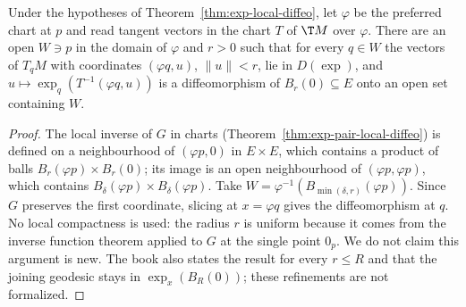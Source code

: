\begin{theorem}
  \label{thm:uniformly-normal}
  \leanok
  Under the hypotheses of Theorem~\ref{thm:exp-local-diffeo}, let $\varphi$ be the preferred chart
  at $p$ and read tangent vectors in the chart $T$ of $\T M$ over $\varphi$. There are an open
  $W \ni p$ in the domain of $\varphi$ and $r > 0$ such that for every $q \in W$ the vectors of
  $T_qM$ with coordinates $(\varphi q, u)$, $\|u\| < r$, lie in $D(\exp)$, and
  $u \mapsto \exp_q(T^{-1}(\varphi q, u))$ is a diffeomorphism of $B_r(0) \subseteq E$ onto an open
  set containing $W$.
\end{theorem}

\begin{proof}
  \leanok
  The local inverse of $G$ in charts (Theorem~\ref{thm:exp-pair-local-diffeo}) is defined on a
  neighbourhood of $(\varphi p, 0)$ in $E \times E$, which contains a product of balls
  $B_r(\varphi p) \times B_r(0)$; its image is an open neighbourhood of $(\varphi p, \varphi p)$,
  which contains $B_\delta(\varphi p) \times B_\delta(\varphi p)$. Take
  $W = \varphi^{-1}(B_{\min(\delta, r)}(\varphi p))$. Since $G$ preserves the first coordinate,
  slicing at $x = \varphi q$ gives the diffeomorphism at $q$. No local compactness is used: the
  radius $r$ is uniform because it comes from the inverse function theorem applied to $G$ at the
  single point $0_p$. We do not claim this argument is new. The book also states the result for
  every $r \le R$ and that the joining geodesic stays in $\exp_x(B_R(0))$; these refinements are
  not formalized.
\end{proof}

